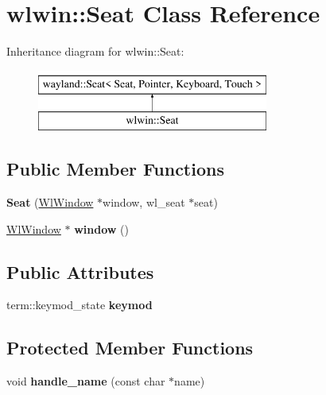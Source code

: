 \hypertarget{classwlwin_1_1Seat}{}\section{wlwin\+::Seat Class Reference}
\label{classwlwin_1_1Seat}
Inheritance diagram for wlwin\+::Seat\+:\begin{figure}[H]
\begin{center}
\leavevmode
\includegraphics[height=2.000000cm]{classwlwin_1_1Seat}
\end{center}
\end{figure}
\subsection*{Public Member Functions}
\begin{DoxyCompactItemize}
\item 
\mbox{\label{classwlwin_1_1Seat_a445e8bf6584ecdf96f918c8903ea9319}} 
{\bfseries Seat} (\mbox{\hyperlink{classwlwin_1_1WlWindow}{Wl\+Window}} $\ast$window, wl\+\_\+seat $\ast$seat)
\item 
\mbox{\label{classwlwin_1_1Seat_a38d13969f46571f76b79ef2282082954}} 
\mbox{\hyperlink{classwlwin_1_1WlWindow}{Wl\+Window}} $\ast$ {\bfseries window} ()
\end{DoxyCompactItemize}
\subsection*{Public Attributes}
\begin{DoxyCompactItemize}
\item 
\mbox{\label{classwlwin_1_1Seat_a8f38a6f25597665dcc23c5d275cff983}} 
term\+::keymod\+\_\+state {\bfseries keymod}
\end{DoxyCompactItemize}
\subsection*{Protected Member Functions}
\begin{DoxyCompactItemize}
\item 
\mbox{\label{classwlwin_1_1Seat_a63acfba0d2c9dff46d0047db87eb1780}} 
void {\bfseries handle\+\_\+name} (const char $\ast$name)
\end{DoxyCompactItemize}
